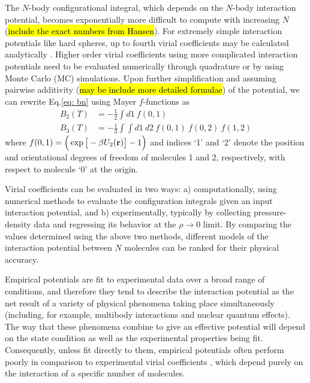         The $N$-body configurational integral, which depends on the $N$-body interaction potential, becomes exponentially more difficult to compute with increasing $N$ (\hl{include the exact numbers from Hansen}). For extremely simple interaction potentials like hard spheres, up to fourth virial coefficients may be calculated analytically \cite{Masters2008}. Higher order virial coefficients using more complicated interaction potentials need to be evaluated numerically through quadrature or by using Monte Carlo (MC) simulations. Upon further simplification and assuming pairwise additivity (\hl{may be include more detailed formulae}) of the potential, we can rewrite Eq.\eqref{eq: bn} using Mayer $f$-functions as \cite{Masters2008,Hansen}
        \begin{equation} \label{eq: mayerfn}
            \begin{aligned}
                B_2(T) &= -\frac{1}{2} \displaystyle\int d1 ~ f(0,1)\\
                B_3(T) &= -\frac{1}{3} \displaystyle\int \int d1~d2~f(0,1)~f(0,2)~f(1,2)
            \end{aligned}
        \end{equation}
        where $f(0,1) = \Big( \exp \big[ -\beta U_2({\mathbf {r}}) \big] - 1 \Big) $ and indices `1' and `2' denote the position and orientational degrees of freedom of molecules 1 and 2, respectively, with respect to molecule `0' at the origin.

        Virial coefficients can be evaluated in two ways: a) computationally, using numerical methods to evaluate the configuration integrals given an input interaction potential, and b) experimentally, typically by collecting pressure-density data and regressing its behavior at the $\rho \to 0$ limit. By comparing the values determined using the above two methods, different models of the interaction potential between $N$ molecules can be ranked for their physical accuracy.

        Empirical potentials are fit to experimental data over a broad range of conditions, and therefore they tend to describe the interaction potential as the net result of a variety of physical phenomena taking place simultaneously (including, for example, multibody interactions and nuclear quantum effects). The way that these phenomena combine to give an effective potential will depend on the state condition as well as the experimental properties being fit. Consequently, unless fit directly to them, empirical potentials often perform poorly in comparison to experimental virial coefficients \cite{Benjamin2007}, which depend purely on the interaction of a specific number of molecules.

